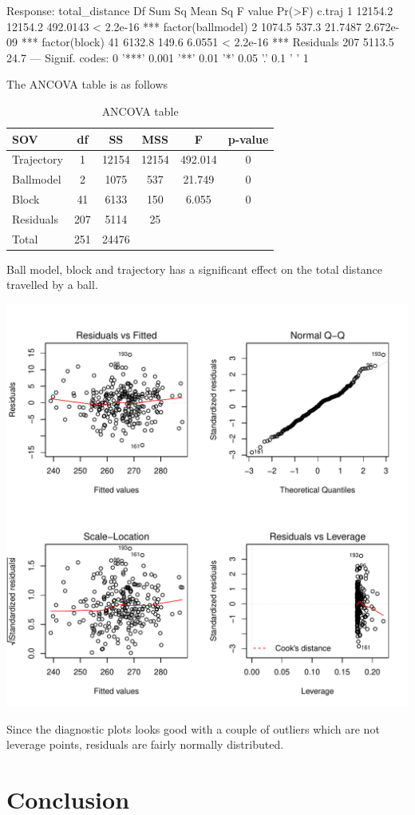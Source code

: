 \documentclass{article}\usepackage[]{graphicx}\usepackage[]{color}
\makeatletter
\def\maxwidth{ %
  \ifdim\Gin@nat@width>\linewidth
    \linewidth
  \else
    \Gin@nat@width
  \fi
}
\makeatother
\begin{document}
Response: total_distance
                   Df  Sum Sq Mean Sq  F value    Pr(>F)    
c.traj              1 12154.2 12154.2 492.0143 < 2.2e-16 ***
factor(ballmodel)   2  1074.5   537.3  21.7487 2.672e-09 ***
factor(block)      41  6132.8   149.6   6.0551 < 2.2e-16 ***
Residuals         207  5113.5    24.7                       
---
Signif. codes:  0 '***' 0.001 '**' 0.01 '*' 0.05 '.' 0.1 ' ' 1



The ANCOVA table is as follows

 \begin{table}[ht]
 \centering
 \begin{tabular}{lccccc}
 \hline
 SOV & df & SS & MSS & F & p-value\\
 \hline
 Trajectory &  1  & 12154 & 12154 & 492.014 &  0 \\
 Ballmodel & 2 &  1075 & 537 & 21.749 & 0\\
 Block &  41 & 6133 & 150 &  6.055 & 0\\
 Residuals  & 207 & 5114 & 25 &  &  \\
 Total     & 251 & 24476 &  &  &   \\
 \hline
 \end{tabular}
 \caption{ANCOVA table}
 \end{table}


Ball model, block and trajectory has a significant effect on the total distance travelled by a ball. 



\includegraphics[width=\maxwidth]{figure/diagnostic_plots-1} 


Since the diagnostic plots looks good with a couple of outliers which are not leverage points, residuals are fairly normally distributed.


\section*{Conclusion}
\end{document}
